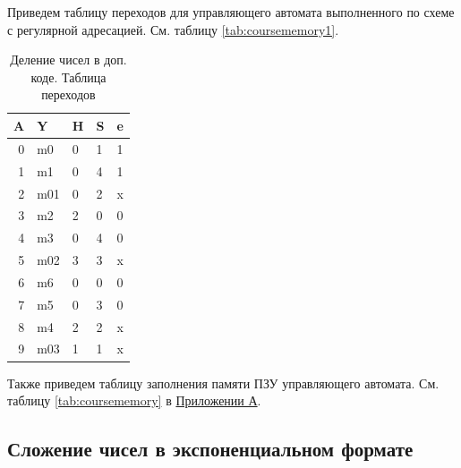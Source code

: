 \documentclass[a4paper,14pt]{extarticle}
\begin{document}
Приведем таблицу переходов для управляющего автомата выполненного по схеме с регулярной адресацией. См. таблицу \ref{tab:coursememory1}.
\begin{table}[h!]
	\centering
	\begin{tabular}{|r||l|l|l|l|}
		\hline
		\multicolumn{1}{|l||}{\textbf{A}} & \textbf{Y} & \textbf{H} & \textbf{S} & \textbf{e} \\ \hline
		0 & m0 & 0 & 1 & 1 \\ \hline
		1 & m1 & 0 & 4 & 1 \\ \hline
		2 & m01 & 0 & 2 & x \\ \hline
		3 & m2 & 2 & 0 & 0 \\ \hline
		4 & m3 & 0 & 4 & 0 \\ \hline
		5 & m02 & 3 & 3 & x \\ \hline
		6 & m6 & 0 & 0 & 0 \\ \hline
		7 & m5 & 0 & 3 & 0 \\ \hline
		8 & m4 & 2 & 2 & x \\ \hline
		9 & m03 & 1 & 1 & x \\ \hline
	\end{tabular}
	\caption{Деление чисел в доп. коде. Таблица переходов}
	\label{tab:coursedivsteps}

\end{table}

Также приведем таблицу заполнения памяти ПЗУ управляющего автомата. См. таблицу \ref{tab:coursememory} в \hyperref[tam]{Приложении А}.

\subsection{Сложение чисел в экспоненциальном формате}
\end{document}

